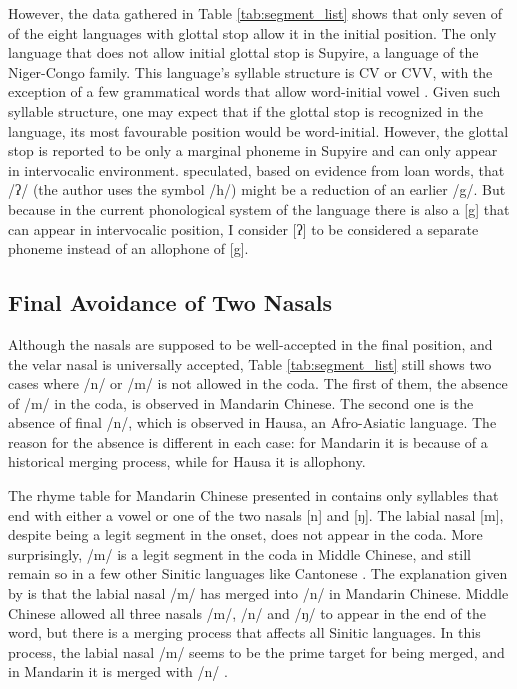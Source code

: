 \par
However, the data gathered in Table \ref{tab:segment_list} shows that only seven of of the eight languages with glottal stop allow it in the initial position. 
The only language that does not allow initial glottal stop is Supyire, a language of the Niger-Congo family. 
This language's syllable structure is CV or CVV, with the exception of a few grammatical words that allow word-initial vowel \citep[7]{carlsonGrammarSupyire1994}. 
Given such syllable structure, one may expect that if the glottal stop is recognized in the language, its most favourable position would be word-initial.
However, the glottal stop is reported to be only a marginal phoneme in Supyire and can only appear in intervocalic environment. 
\citet{carlsonGrammarSupyire1994} speculated, based on evidence from loan words, that /ʔ/ (the author uses the symbol /h/) might be a reduction of an earlier /g/.
But because in the current phonological system of the language there is also a [g] that can appear in intervocalic position, I consider [ʔ] to be considered a separate phoneme instead of an allophone of [g].

\subsection{Final Avoidance of Two Nasals}

Although the nasals are supposed to be well-accepted in the final position, and the velar nasal is universally accepted, Table \ref{tab:segment_list} still shows two cases where /n/ or /m/ is not allowed in the coda. 
The first of them, the absence of /m/ in the coda, is observed in Mandarin Chinese.
The second one is the absence of final /n/, which is observed in Hausa, an Afro-Asiatic language.
The reason for the absence is different in each case: for Mandarin it is because of a historical merging process, while for Hausa it is allophony.

\par
The rhyme table for Mandarin Chinese presented in \citet{liMandarinChineseFunctional2009} contains only syllables that end with either a vowel or one of the two nasals [n] and [ŋ].
The labial nasal [m], despite being a legit segment in the onset, does not appear in the coda.
More surprisingly, /m/ is a legit segment in the coda in Middle Chinese, and still remain so in a few other Sinitic languages like Cantonese \citep{zee1985sound}. 
The explanation given by \citet{zee1985sound} is that the labial nasal /m/ has merged into /n/ in Mandarin Chinese.
Middle Chinese allowed all three nasals /m/, /n/ and /ŋ/ to appear in the end of the word, but there is a merging process that affects all Sinitic languages.
In this process, the labial nasal /m/ seems to be the prime target for being merged, and in Mandarin it is merged with /n/ \citep{zee1985sound}.

